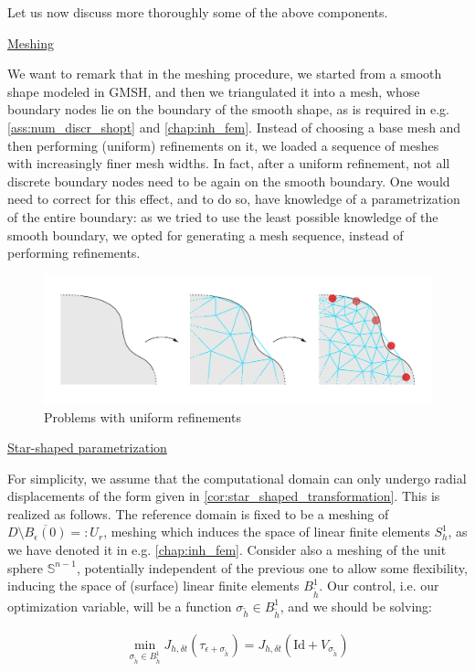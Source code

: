 \documentclass[english,a4paper,10pt,oneside]{scrbook}	%
\theoremstyle{break}
\theoremstyle{remark}
\newcommand{\mS}{\mathbb{S}^{n-1}}
\newcommand{\id}{\text{Id}}
\newcommand{\eps}{\epsilon}
\begin{document}
Let us now discuss more thoroughly some of the above components.

\underline{Meshing}

We want to remark that in the meshing procedure, we started from a smooth shape modeled in GMSH, and then we triangulated it into a mesh, whose boundary nodes lie on the boundary of the smooth shape, as is required in e.g. \cref{ass:num_discr_shopt} and \cref{chap:inh_fem}. Instead of choosing a base mesh and then performing (uniform) refinements on it, we loaded a sequence of meshes with increasingly finer mesh widths. In fact, after a uniform refinement, not all discrete boundary nodes need to be again on the smooth boundary. One would need to correct for this effect, and to do so, have knowledge of a parametrization of the entire boundary: as we tried to use the least possible knowledge of the smooth boundary, we opted for generating a mesh sequence, instead of performing refinements.

\begin{figure}[H]
\centering
\includegraphics[width=0.95\columnwidth]{Images/UniformRefinement.pdf}
\caption{Problems with uniform refinements}\label{fig:uniform_refinement}
\end{figure}

\underline{Star-shaped parametrization}

For simplicity, we assume that the computational domain can only undergo radial displacements of the form given in \cref{cor:star_shaped_transformation}. This is realized as follows. The reference domain is fixed to be a meshing of $D\setminus \overline{B_\epsilon(0)}=:U_r$, meshing which induces the space of linear finite elements $S^1_h$, as we have denoted it in e.g. \cref{chap:inh_fem}. Consider also a meshing of the unit sphere $\mS$, potentially independent of the previous one to allow some flexibility, inducing the space of (surface) linear finite elements $B^1_{\tilde{h}}$. Our control, i.e. our optimization variable, will be a function $ \sigma_{\tilde{h}} \in B^1_{\tilde{h}}$, and we should be solving:

\begin{align*}
	\min_{\sigma_{\tilde{h}} \in B^1_{\tilde{h}}} J_{h,\delta t}(\tau_{\eps+\sigma_{\tilde{h}}}) = J_{h,\delta t }(\id  + V_{\sigma_{\tilde{h}}})
\end{align*}
\end{document}
